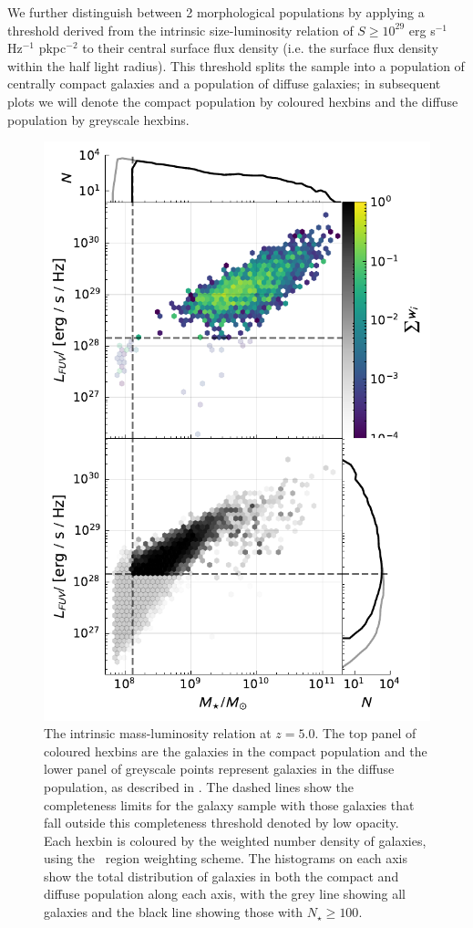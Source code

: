 We further distinguish between 2 morphological populations by applying a threshold derived from the intrinsic size-luminosity relation of $S \geq 10^{29}$ erg s$^{-1}$ Hz$^{-1}$ pkpc$^{-2}$ to their central surface flux density (i.e. the surface flux density within the half light radius). This threshold splits the sample into a population of centrally compact galaxies and a population of diffuse galaxies; in subsequent plots we will denote the compact population by coloured hexbins and the diffuse population by greyscale hexbins.

\begin{figure}
	\includegraphics[width=\columnwidth]{Figures/MassLumin_FAKE.TH.FUV_5.0_sim_Intrinsic_default.pdf}
    \caption{The intrinsic mass-luminosity relation at $z=5.0$. The top panel of coloured hexbins are the galaxies in the compact population and the lower panel of greyscale points represent galaxies in the diffuse population, as described in . The dashed lines show the completeness limits for the galaxy sample with those galaxies that fall outside this completeness threshold denoted by low opacity. Each hexbin is coloured by the weighted number density of galaxies, using the \flares\ region weighting scheme. The histograms on each axis show the total distribution of galaxies in both the compact and diffuse population along each axis, with the grey line showing all galaxies and the black line showing those with $N_\star\geq100$.}
    \label{fig:int_lumin_mass}
\end{figure}

